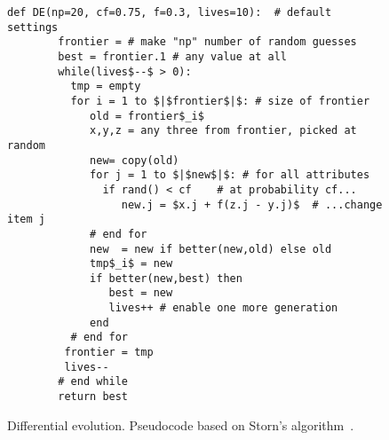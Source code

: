 \documentclass[sigconf,review,anonymous]{acmart}
\begin{document}
 \begin{figure}[!t]
    \small 
    \begin{lstlisting}[mathescape,linewidth=7.5cm,frame=none,numbers=right ]
      def DE(np=20, cf=0.75, f=0.3, lives=10):  # default settings
        frontier = # make "np" number of random guesses
        best = frontier.1 # any value at all
        while(lives$--$ > 0): 
          tmp = empty
          for i = 1 to $|$frontier$|$: # size of frontier
             old = frontier$_i$
             x,y,z = any three from frontier, picked at random
             new= copy(old)
             for j = 1 to $|$new$|$: # for all attributes
               if rand() < cf    # at probability cf...
                  new.j = $x.j + f(z.j - y.j)$  # ...change item j
             # end for
             new  = new if better(new,old) else old
             tmp$_i$ = new 
             if better(new,best) then
                best = new
                lives++ # enable one more generation
             end
          # end for
         frontier = tmp
         lives--
        # end while
        return best
    \end{lstlisting} 
    \caption{Differential evolution. Pseudocode based on Storn's algorithm~\cite{storn1997differential}.}
    \label{fig:pseudo_DE} 
    \vspace{-0.3cm}
    \end{figure}
\end{document}
